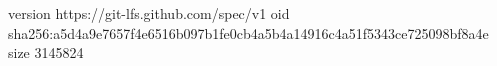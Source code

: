version https://git-lfs.github.com/spec/v1
oid sha256:a5d4a9e7657f4e6516b097b1fe0cb4a5b4a14916c4a51f5343ce725098bf8a4e
size 3145824
